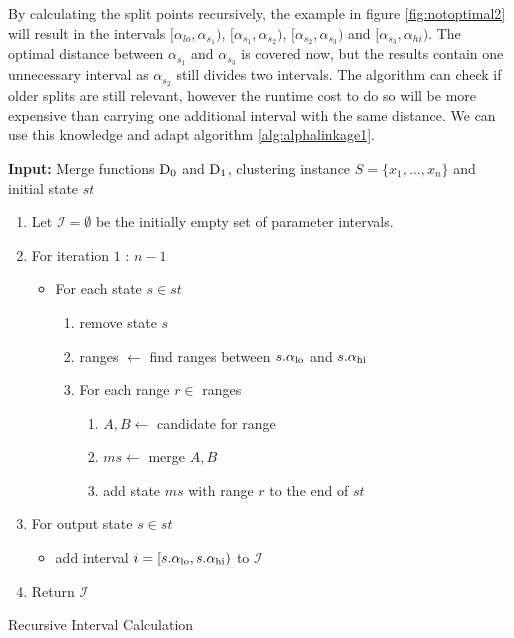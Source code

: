 By calculating the split points recursively, the example in figure \ref{fig:notoptimal2} will result in the intervals $[\alpha_{lo}, \alpha_{s_1})$, $[\alpha_{s_1}, \alpha_{s_2})$, $[\alpha_{s_2}, \alpha_{s_3})$ and $[\alpha_{s_3}, \alpha_{hi})$. The optimal distance between $\alpha_{s_1}$ and $\alpha_{s_3}$ is covered now, but the results contain one unnecessary interval as $\alpha_{s_2}$ still divides two intervals. The algorithm can check if older splits are still relevant, however the runtime cost to do so will be more expensive than carrying one additional interval with the same distance. We can use this knowledge and adapt algorithm \ref{alg:alphalinkage1}.

\begin{algorithm}
    \textbf{Input:} Merge functions $\operatorname{D_{0}}$ and $\operatorname{D_{1}}$, clustering instance $S = \{x_1, \dots, x_n\}$ and initial state $st$
    \begin{enumerate}[nosep, leftmargin=*]
    \item Let $\mathcal{I} = \emptyset$ be the initially empty set of parameter intervals.
    \item For iteration $1$ : $n-1$
    \begin{itemize}[nosep, leftmargin=*]
        \item For each state $s \in st$
        \begin{enumerate}[nosep, leftmargin=*]
            \item remove state $s$
            \item ranges $\gets$ find ranges between $s.\alpha_\text{lo}$ and $s.\alpha_\text{hi}$
            \item For each range $r \in$ ranges
            \begin{enumerate}
                \item $A, B \gets$ candidate for range
                \item $ms \gets$ merge $A, B$\;
                \item add state $ms$ with range $r$ to the end of $st$
            \end{enumerate}
        \end{enumerate}
    \end{itemize}
    \item For output state $s \in st$
            \begin{itemize}
                \item add interval $i = [s.\alpha_\text{lo}, s.\alpha_\text{hi})$ to $\mathcal{I}$
            \end{itemize}
        \item Return $\mathcal{I}$
    \end{enumerate}
    \caption{Recursive Interval Calculation}
    \label{alg:alphalinkage2}
\end{algorithm}

